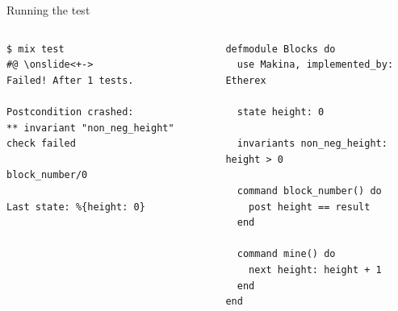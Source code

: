 \documentclass[aspectratio=169, 10pt, handout]{beamer}
\begin{document}
\begin{frame}[label={sec:org99c4bfc},fragile]{Running the test}
 \begin{columns}
\begin{column}{0.48\columnwidth}
\onslide<+->
\lstset{language=bash,label= ,caption= ,captionpos=b,numbers=none,style=shell}
\begin{lstlisting}
$ mix test
#@ \onslide<+->
Failed! After 1 tests.

Postcondition crashed:
** invariant "non_neg_height" check failed

block_number/0

Last state: %{height: 0}
\end{lstlisting}
\end{column}

\begin{column}{0.48\columnwidth}
\lstset{language=elixir,label= ,caption= ,captionpos=b,numbers=none,style=display}
\begin{lstlisting}
defmodule Blocks do
  use Makina, implemented_by: Etherex

  state height: 0

  invariants non_neg_height: height > 0

  command block_number() do
    post height == result
  end

  command mine() do
    next height: height + 1
  end
end
\end{lstlisting}
\end{column}
\end{columns}
\end{frame}
\end{document}
